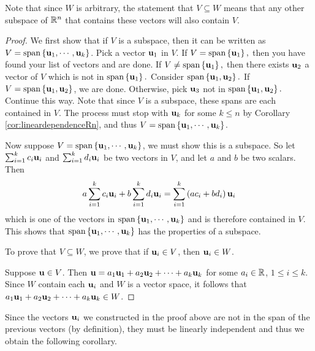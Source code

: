 Note that since $W$ is arbitrary, the statement that $V \subseteq W$ means that any other subspace of $\mathbb{R}^n$ that contains these vectors will also contain $V$. 

\begin{proof}
We first show that if $V$ is a subspace, then it can be written as $V= \mbox{span}\left\{{\bf u}_{1},\cdots ,{\bf u}_{k}\right\}$. Pick a vector ${\bf u}_{1}$ in $V$. If $V=
\mbox{span}\left\{{\bf u}_{1}\right\} ,$ then you have found your
list of vectors and are done. If $V\neq \mbox{span}\left\{{\bf u}_{1}\right\} ,$ then
there exists ${\bf u}_{2}$ a vector of $V$ which is not in $
\mbox{span}\left\{{\bf u}_{1}\right\} .$ Consider $\mbox{span}\left\{
{\bf u}_{1},{\bf u}_{2}\right\}.$ 
If $V=\mbox{span}\left\{{\bf u}_{1},{\bf u}_{2}\right\}$, we are
done. Otherwise, pick ${\bf u}_{3}$ not in $\mbox{span}\left\{{\bf u}_{1},{\bf u}_{2}\right\} .$ Continue this way.
Note that since $V $ is a subspace, these spans are each contained in
$V$.  The process must stop with ${\bf u}_{k}$ for some $k\leq n$
by Corollary \ref{cor:lineardependenceRn}, and thus $V=\mbox{span}\left\{{\bf u}_{1},\cdots ,
{\bf u}_{k}\right\}$.

Now suppose $V=\mbox{span}\left\{{\bf u}_{1},\cdots ,
{\bf u}_{k}\right\}$, we must show this is a subspace. So let $\sum_{i=1}^{k}c_{i}{\bf u}_{i}$ and $
\sum_{i=1}^{k}d_{i}{\bf u}_{i}$ be two vectors in $V$, and let $a$
and $b$ be two scalars. Then 
\begin{equation*}
a \sum_{i=1}^{k}c_{i}{\bf u}_{i}+ b \sum_{i=1}^{k}d_{i}{\bf u}_{i}=
 \sum_{i=1}^{k}\left(a c_{i}+b  d_{i}\right) {\bf u}_{i}
\end{equation*}
which is one of the vectors in $\mbox{span}\left\{{\bf u}_{1},\cdots ,
{\bf u}_{k}\right\}$ and is therefore contained in $V$. This shows that $\mbox{span}\left\{{\bf u}_{1},\cdots ,{\bf u}_{k}\right\} $ has the properties of a subspace. 

To prove that $V \subseteq W$, we prove that if
${\bf u}_i\in V$, then ${\bf u}_i \in W$.

Suppose ${\bf u}\in V$. 
Then ${\bf u}=a_1{\bf u}_1 + a_2{\bf u}_2 + \cdots + a_k{\bf u}_k$
for some $a_i\in\mathbb{R}$, $1\leq i\leq k$.
Since $W$ contain each ${\bf u}_i$ and $W$ is a vector space, it follows that $ a_1{\bf u}_1 + a_2{\bf u}_2 + \cdots + a_k{\bf u}_k \in W$. 
\end{proof}

Since the vectors ${\bf u}_i$ we constructed in the proof above are not in the span
of the previous vectors (by definition), they must be linearly independent and thus we
obtain the following corollary.

